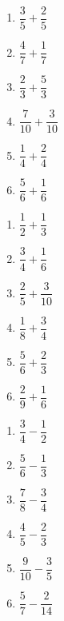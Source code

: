 \documentclass[11pt]{article}
\begin{document}
\begin{exercice}
\begin{multicols}{2}
\begin{enumerate}
\item $\dfrac{3}{5} + \dfrac{2}{5}$
\item $\dfrac{4}{7} + \dfrac{1}{7}$
\item $\dfrac{2}{3} + \dfrac{5}{3}$
\item $\dfrac{7}{10} + \dfrac{3}{10}$
\item $\dfrac{1}{4} + \dfrac{2}{4}$
\item $\dfrac{5}{6} + \dfrac{1}{6}$
\end{enumerate}
\end{multicols}
\end{exercice}

\begin{exercice}
\begin{multicols}{2}
\begin{enumerate}
\item $\dfrac{1}{2} + \dfrac{1}{3}$
\item $\dfrac{3}{4} + \dfrac{1}{6}$
\item $\dfrac{2}{5} + \dfrac{3}{10}$
\item $\dfrac{1}{8} + \dfrac{3}{4}$
\item $\dfrac{5}{6} + \dfrac{2}{3}$
\item $\dfrac{2}{9} + \dfrac{1}{6}$
\end{enumerate}
\end{multicols}
\end{exercice}

\begin{exercice}
\begin{multicols}{2}
\begin{enumerate}
\item $\dfrac{3}{4} - \dfrac{1}{2}$
\item $\dfrac{5}{6} - \dfrac{1}{3}$
\item $\dfrac{7}{8} - \dfrac{3}{4}$
\item $\dfrac{4}{5} - \dfrac{2}{3}$
\item $\dfrac{9}{10} - \dfrac{3}{5}$
\item $\dfrac{5}{7} - \dfrac{2}{14}$
\end{enumerate}
\end{multicols}
\end{exercice}
\end{document}
